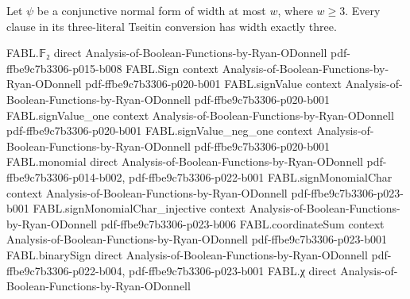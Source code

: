 \begin{theorem}
\label{FABL.exactlyThreeTseitin_clause_width_eq_three}
\leanok
{}
Let $\psi$ be a conjunctive normal form of width at most $w$, where $w\geq 3$. Every
clause in its three-literal Tseitin conversion has width exactly three.
\end{theorem}

\begin{theorem}
\label{FABL.exactlyThreeTseitin_size_le}
\leanok
{}
\proofstep
  {FABL.𝔽₂}
  {direct}
  {Analysis-of-Boolean-Functions-by-Ryan-ODonnell}
  {pdf-ffbe9c7b3306-p015-b008}
\proofstep
  {FABL.Sign}
  {context}
  {Analysis-of-Boolean-Functions-by-Ryan-ODonnell}
  {pdf-ffbe9c7b3306-p020-b001}
\proofstep
  {FABL.signValue}
  {context}
  {Analysis-of-Boolean-Functions-by-Ryan-ODonnell}
  {pdf-ffbe9c7b3306-p020-b001}
\proofstep
  {FABL.signValue_one}
  {context}
  {Analysis-of-Boolean-Functions-by-Ryan-ODonnell}
  {pdf-ffbe9c7b3306-p020-b001}
\proofstep
  {FABL.signValue_neg_one}
  {context}
  {Analysis-of-Boolean-Functions-by-Ryan-ODonnell}
  {pdf-ffbe9c7b3306-p020-b001}
\proofstep
  {FABL.monomial}
  {direct}
  {Analysis-of-Boolean-Functions-by-Ryan-ODonnell}
  {pdf-ffbe9c7b3306-p014-b002,
    pdf-ffbe9c7b3306-p022-b001}
\proofstep
  {FABL.signMonomialChar}
  {context}
  {Analysis-of-Boolean-Functions-by-Ryan-ODonnell}
  {pdf-ffbe9c7b3306-p023-b001}
\proofstep
  {FABL.signMonomialChar_injective}
  {context}
  {Analysis-of-Boolean-Functions-by-Ryan-ODonnell}
  {pdf-ffbe9c7b3306-p023-b006}
\proofstep
  {FABL.coordinateSum}
  {context}
  {Analysis-of-Boolean-Functions-by-Ryan-ODonnell}
  {pdf-ffbe9c7b3306-p023-b001}
\proofstep
  {FABL.binarySign}
  {direct}
  {Analysis-of-Boolean-Functions-by-Ryan-ODonnell}
  {pdf-ffbe9c7b3306-p022-b004,
    pdf-ffbe9c7b3306-p023-b001}
\proofstep
  {FABL.χ}
  {direct}
  {Analysis-of-Boolean-Functions-by-Ryan-ODonnell}

\end{theorem}
